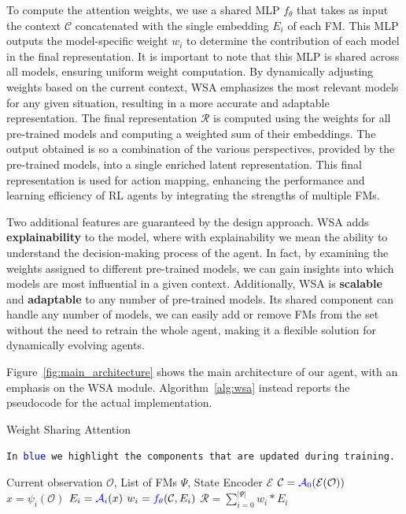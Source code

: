 To compute the attention weights, we use a shared MLP $f_\theta$ that takes as input the context $\mathcal{C}$ concatenated with the single embedding $E_i$ of each FM\@.
This MLP outputs the model-specific weight $w_i$ to determine the contribution of each model in the final representation.
It is important to note that this MLP is shared across all models, ensuring uniform weight computation.
By dynamically adjusting weights based on the current context, WSA emphasizes the most relevant models for any given situation, resulting in a more accurate and adaptable representation.
The final representation $\mathcal{R}$ is computed using the weights for all pre-trained models and computing a weighted sum of their embeddings.
The output obtained is so a combination of the various perspectives, provided by the pre-trained models, into a single enriched latent representation.
This final representation is used for action mapping, enhancing the performance and learning efficiency of RL agents by integrating the strengths of multiple FMs.


Two additional features are guaranteed by the design approach.
WSA adds \textbf{explainability} to the model, where with explainability we mean the ability to understand the decision-making process of the agent.
In fact, by examining the weights assigned to different pre-trained models, we can gain insights into which models are most influential in a given context.
Additionally, WSA is \textbf{scalable} and \textbf{adaptable} to any number of pre-trained models.
Its shared component can handle any number of models, we can easily add or remove FMs from the set without the need to retrain the whole agent, making it a flexible solution for dynamically evolving agents.

Figure~\ref{fig:main_architecture} shows the main architecture of our agent, with an emphasis on the WSA module.
Algorithm~\ref{alg:wsa} instead reports the pseudocode for the actual implementation.

\begin{algorithm}[ht]
    \caption{Weight Sharing Attention}\label{alg:wsa}
    \texttt{In \textcolor{blue}{blue} we highlight the components that are updated during training.}\\
    \begin{algorithmic}[1]
        \Require Current observation $\mathcal{O}$, List of FMs $\Psi$, State Encoder $\mathcal{E}$
        \State $\mathcal{C} = \textcolor{blue}{\mathcal{A}_0}(\mathcal{E}(\mathcal{O}))$ 
            \State $x = \psi_i(\mathcal{O})$ 
            \State $E_i = \textcolor{blue}{\mathcal{A}_i}(x)$ 
            \State $w_i = \textcolor{blue}{f_\theta}(\mathcal{C}, E_i)$ 
        \EndFor
        \State $\mathcal{R} = \sum_{i=0}^{|\Psi|} w_i * E_i$ 
    \end{algorithmic}
\end{algorithm}




